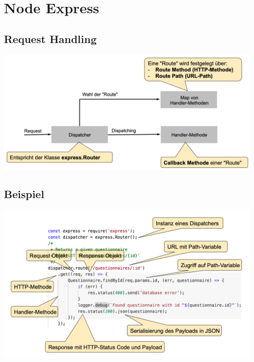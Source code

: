 \section{Node Express}
\subsection{Request Handling}

\includegraphics[width=\columnwidth]{images/noderequesthandling}
\subsection{Beispiel}
\includegraphics[width=\columnwidth]{images/requesthandlingexample}
